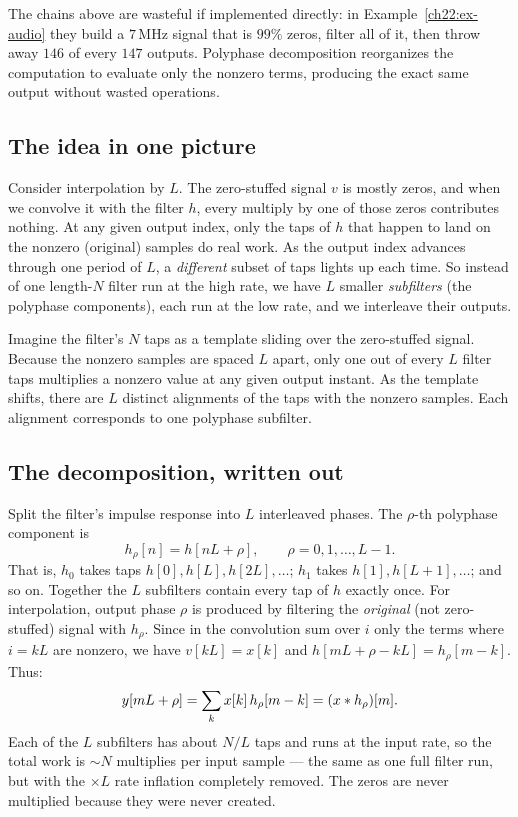 The chains above are wasteful if implemented directly: in
Example~\ref{ch22:ex-audio} they build a $7$\,MHz signal that is $99\%$ zeros,
filter all of it, then throw away $146$ of every $147$ outputs. Polyphase decomposition reorganizes the computation to evaluate only the nonzero terms, producing the exact same output without wasted operations.

\subsection{The idea in one picture}

Consider interpolation by $L$. The zero-stuffed signal $v$ is mostly zeros, and
when we convolve it with the filter $h$, every multiply by one of those zeros
contributes nothing. At any given output index, only the taps of $h$ that happen
to land on the nonzero (original) samples do real work. As the output index
advances through one period of $L$, a \emph{different} subset of taps lights up
each time. So instead of one length-$N$ filter run at the high rate, we have $L$
smaller \emph{subfilters} (the polyphase components), each run at the low rate,
and we interleave their outputs.

\begin{intuitionbox}
Imagine the filter's $N$ taps as a template sliding over the zero-stuffed signal. Because the nonzero samples are spaced $L$ apart, only one out of every $L$ filter taps multiplies a nonzero value at any given output instant. As the template shifts, there are $L$ distinct alignments of the taps with the nonzero samples. Each alignment corresponds to one polyphase subfilter.
\end{intuitionbox}

\subsection{The decomposition, written out}

Split the filter's impulse response into $L$ interleaved phases. The $\rho$-th
polyphase component is
\begin{equation}
  h_\rho[n] = h[n L + \rho], \qquad \rho = 0, 1, \dots, L-1.
  \label{ch22:polydef}
\end{equation}
That is, $h_0$ takes taps $h[0], h[L], h[2L], \dots$; $h_1$ takes
$h[1], h[L+1], \dots$; and so on. Together the $L$ subfilters contain every tap
of $h$ exactly once. For interpolation, output phase $\rho$ is produced by
filtering the \emph{original} (not zero-stuffed) signal with $h_\rho$. Since in the convolution sum over $i$ only the terms where $i=k L$ are nonzero, we have $v[k L] = x[k]$ and $h[m L + \rho - k L] = h_\rho[m - k]$. Thus:
\begin{equation}
  y[m L + \rho] = \sum_k x[k]\,h_\rho[m - k] = (x \ast h_\rho)[m].
  \label{ch22:polyinterp}
\end{equation}
Each of the $L$ subfilters has about $N/L$ taps and runs at the input rate, so
the total work is $\sim N$ multiplies per input sample --- the same as one full
filter run, but with the $\times L$ rate inflation completely removed. The zeros
are never multiplied because they were never created.

